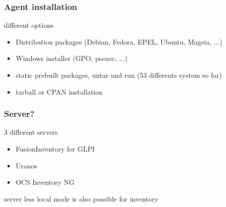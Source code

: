 \begin{frame}
    \frametitle{Agent installation}


    \begin{block}{different options}
        \begin{itemize}
            \item Distribution packages \small{(Debian, Fedora, EPEL, Ubuntu, Mageia, ...)}
            \item Windows installer (GPO, psexec, ...)
            \item static prebuilt packages, untar and run \small{(53 differents system so far)}
            \item tarball or CPAN installation
        \end{itemize}
    \end{block}
\end{frame}




\begin{frame}
    \frametitle{Server?}

    \begin{block}{3 different servers}
        \begin{itemize}
            \item FusionInventory for GLPI
            \item Uranos
            \item OCS Inventory NG
        \end{itemize}
    \end{block}

    \pause


    \begin{block}{server less}
        local mode is also possible for inventory
    \end{block}
\end{frame}




